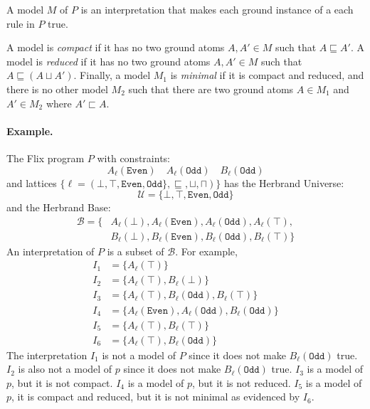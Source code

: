 \documentclass[10pt,twocolumn]{article}
\begin{document}
A model $M$ of $P$ is an interpretation that makes each ground instance of a each rule in $P$ true.

A model is \emph{compact} if it has no two ground atoms $A, A' \in M$ such that $A \sqsubseteq A'$.
%
A model is \emph{reduced} if it has no two ground atoms $A, A' \in M$ such that $A \sqsubseteq (A \sqcup A')$.
%
Finally, a model $M_1$ is \emph{minimal} if it is compact and reduced, and there is no other model $M_2$ 
such that there are two ground atoms $A \in M_1$ and $A' \in M_2$ where $A' \sqsubset A$.

\paragraph{Example.}
The Flix program $P$ with constraints:
\[
    A_\ell(\texttt{Even}) \quad A_\ell(\texttt{Odd}) \quad B_\ell(\texttt{Odd})
\]
and lattices $\{ \ell = (\bot, \top, \texttt{Even}, \texttt{Odd}\}, \sqsubseteq, \sqcup, \sqcap) \}$ has
the Herbrand Universe:
%
\[
    \mathcal{U} = \{\bot, \top, \texttt{Even}, \texttt{Odd}\}
\]
%
and the Herbrand Base: 
%
\begin{align*}
    \mathcal{B} = \{ & A_\ell(\bot), A_\ell(\texttt{Even}), A_\ell(\texttt{Odd}), A_\ell(\top), \\
                     & B_\ell(\bot), B_\ell(\texttt{Even}), B_\ell(\texttt{Odd}), B_\ell(\top) \}
\end{align*}
%
An interpretation of $P$ is a subset of $\mathcal{B}$.
For example,
%
\begin{align*}
    I_1 & = \{ A_\ell(\top) \} \\
    I_2 & = \{ A_\ell(\top), B_\ell(\bot) \} \\
    I_3 & = \{ A_\ell(\top), B_\ell(\texttt{Odd}), B_\ell(\top) \} \\
    I_4 & = \{ A_\ell(\texttt{Even}), A_\ell(\texttt{Odd}), B_\ell(\texttt{Odd}) \} \\
    I_5 & = \{ A_\ell(\top), B_\ell(\top) \} \\
    I_6 & = \{ A_\ell(\top), B_\ell(\texttt{Odd}) \}
\end{align*}
%
The interpretation 
$I_1$ is not a model of $P$ since it does not make $B_\ell(\texttt{Odd})$ true.
$I_2$ is also not a model of $p$ since it does not make $B_\ell(\texttt{Odd})$ true.
$I_3$ is a model of $p$, but it is not compact.
$I_4$ is a model of $p$, but it is not reduced.
$I_5$ is a model of $p$, it is compact and reduced, but it is not minimal as evidenced by $I_6$.
\end{document}
